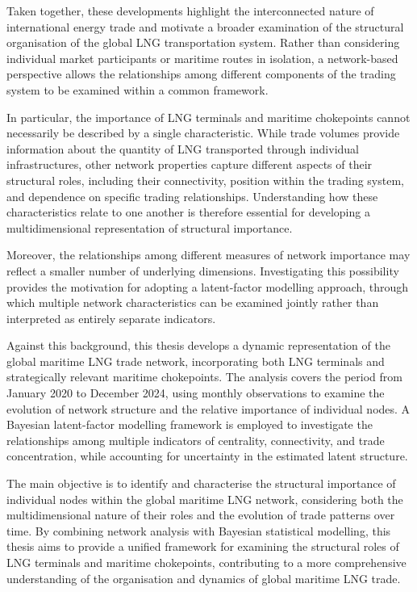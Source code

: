 \documentclass[pdftex,12pt,openright,a4paper,oneside]{book}
\begin{document}
Taken together, these developments highlight the interconnected nature of international energy trade and motivate a broader examination of the structural organisation of the global LNG transportation system. Rather than considering individual market participants or maritime routes in isolation, a network-based perspective allows the relationships among different components of the trading system to be examined within a common framework.

In particular, the importance of LNG terminals and maritime chokepoints cannot necessarily be described by a single characteristic. While trade volumes provide information about the quantity of LNG transported through individual infrastructures, other network properties capture different aspects of their structural roles, including their connectivity, position within the trading system, and dependence on specific trading relationships. Understanding how these characteristics relate to one another is therefore essential for developing a multidimensional representation of structural importance.

Moreover, the relationships among different measures of network importance may reflect a smaller number of underlying dimensions. Investigating this possibility provides the motivation for adopting a latent-factor modelling approach, through which multiple network characteristics can be examined jointly rather than interpreted as entirely separate indicators.

Against this background, this thesis develops a dynamic representation of the global maritime LNG trade network, incorporating both LNG terminals and strategically relevant maritime chokepoints. The analysis covers the period from January 2020 to December 2024, using monthly observations to examine the evolution of network structure and the relative importance of individual nodes. A Bayesian latent-factor modelling framework is employed to investigate the relationships among multiple indicators of centrality, connectivity, and trade concentration, while accounting for uncertainty in the estimated latent structure.

The main objective is to identify and characterise the structural importance of individual nodes within the global maritime LNG network, considering both the multidimensional nature of their roles and the evolution of trade patterns over time. By combining network analysis with Bayesian statistical modelling, this thesis aims to provide a unified framework for examining the structural roles of LNG terminals and maritime chokepoints, contributing to a more comprehensive understanding of the organisation and dynamics of global maritime LNG trade.
\end{document}
